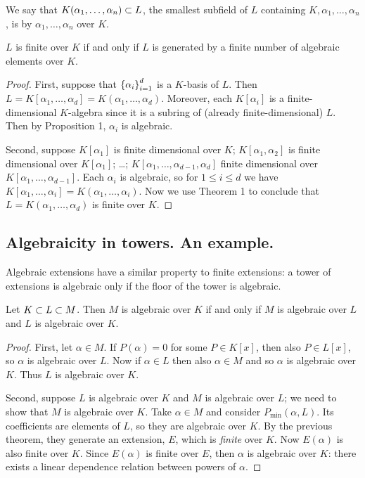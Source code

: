 \begin{defn}
We say that $K(\alpha_1, \dotsc, \alpha_n) \subset L$, the smallest subfield of $L$ containing $K, \alpha_1, \dotsc, \alpha_n$, is  by $\alpha_1, \dotsc, \alpha_n$ over $K$.
\end{defn}

\begin{thm}
$L$ is finite over $K$ if and only if $L$ is generated by a finite number of algebraic elements over $K$.
\end{thm}
\begin{proof}
First, suppose that $\left\{\alpha_i\right\}_{i=1}^{d}$ is a $K$-basis of $L$. Then $L = K[\alpha_1, \dotsc, \alpha_d] = K(\alpha_1, \dotsc, \alpha_d)$. Moreover, each $K[\alpha_i]$ is a finite-dimensional $K$-algebra since it is a subring of (already finite-dimensional) $L$. Then by Proposition 1, $\alpha_i$ is algebraic.

Second, suppose $K[\alpha_1]$ is finite dimensional over $K$; $K[\alpha_1, \alpha_2]$ is finite dimensional over $K[\alpha_1]$; \ldots; $K[\alpha_1, \dotsc, \alpha_{d-1}, \alpha_d]$ finite dimensional over $K[\alpha_1, \dotsc, \alpha_{d-1}]$. Each $\alpha_i$ is algebraic, so for $1 \leq i \leq d$ we have $K[\alpha_1, \dotsc, \alpha_i] = K(\alpha_1, \dotsc, \alpha_i)$. Now we use Theorem 1 to conclude that $L = K(\alpha_1, \dotsc, \alpha_d)$ is finite over $K$.
\end{proof}

\subsection{Algebraicity in towers. An example.}
Algebraic extensions have a similar property to finite extensions: a tower of extensions is algebraic only if the floor of the tower is algebraic.

\begin{thm}
Let $K \subset L \subset M$. Then $M$ is algebraic over $K$ if and only if $M$ is algebraic over $L$ and $L$ is algebraic over $K$.
\end{thm}
\begin{proof}
First, let $\alpha \in M$. If $P(\alpha) = 0$ for some $P \in K[x]$, then also $P \in L[x]$, so $\alpha$ is algebraic over $L$. Now if $\alpha \in L$ then also $\alpha \in M$ and so $\alpha$ is algebraic over $K$. Thus $L$ is algebraic over $K$.

Second, suppose $L$ is algebraic over $K$ and $M$ is algebraic over $L$; we need to show that $M$ is algebraic over $K$. Take $\alpha \in M$ and consider $P_{\min}(\alpha, L)$. Its coefficients are elements of $L$, so they are algebraic over $K$. By the previous theorem, they generate an extension, $E$, which is \emph{finite} over $K$. Now $E(\alpha)$ is also finite over $K$. Since $E(\alpha)$ is finite over $E$, then $\alpha$ is algebraic over $K$: there exists a linear dependence relation between powers of $\alpha$.
\end{proof}


